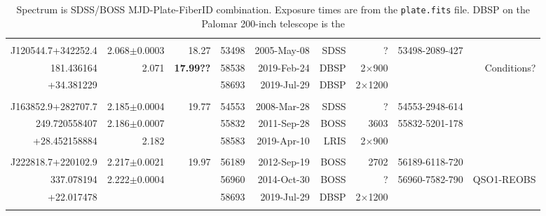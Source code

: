 \documentclass[a4paper,fleqn,usenatbib]{mnras}
\begin{document}
\begin{table*}
\begin{tabular}{r  r  r r r   r r r r}
 \hline 
                                       &                                   &                        &             &                          &                   &                             &  & \\
   J120544.7+342252.4   & 2.068$\pm$0.0003   &   18.27            & 53498  &  2005-May-08  & SDSS             & ?                          & 53498-2089-427  & \\
          181.436164           & 2.071                        & {\bf 17.99??}  & 58538  &  2019-Feb-24   & DBSP            &  2$\times$900    &                               &  Conditions? \\
         +34.381229           &                                   &                          & 58693  &  2019-Jul-29    & DBSP            &  2$\times$1200   &                                &   \\
                                       &                                   &               &              &                           &                   &                             &  & \\
   J163852.9+282707.7   & 2.185$\pm$0.0004   &   19.77    & 54553 & 2008-Mar-28    & SDSS             & ?                          & 54553-2948-614  & \\
      249.720558407	       &  2.186$\pm$0.0007   &              & 55832  & 2011-Sep-28     & BOSS            &   3603                  & 55832-5201-178  & \\
       +28.452158884        &  2.182             &                & 58583 & 2019-Apr-10        & LRIS              &  2$\times$900    &   & \\
                                       &                                     &                   &              &                           &                   &                             &  & \\
    J222818.7+220102.9   & 2.217$\pm$0.0021    & 19.97      & 56189 & 2012-Sep-19     & BOSS             &  2702               & 56189-6118-720   & \\
        337.078194              & 2.222$\pm$0.0004    &                & 56960 & 2014-Oct-30    & BOSS             & ?                         & 56960-7582-790     & QSO1-REOBS \\ 
        +22.017478              &                                   &                & 58693 & 2019-Jul-29      & DBSP              & 2$\times$1200  &       &    \\
                                        &                                     &                &            &                            &                   &                              &  & \\
   \hline \hline   
  \end{tabular}
  \caption{Spectrum is SDSS/BOSS MJD-Plate-FiberID combination. 
Exposure times are from the {\tt plate.fits} file. 
DBSP on the Palomar 200-inch telescope is the } 
 \label{tab:obs_notes}
\end{table*}
\end{document}

